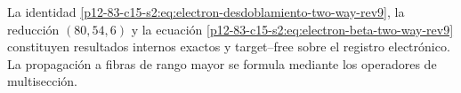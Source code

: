 \begin{statusbox}[title={Clausura interna del refinamiento bidireccional}]
La identidad \eqref{p12-83-c15-s2:eq:electron-desdoblamiento-two-way-rev9}, la reducción
\((80,54,6)\) y la ecuación
\eqref{p12-83-c15-s2:eq:electron-beta-two-way-rev9} constituyen resultados internos exactos
y target--free sobre el registro electrónico. La propagación a fibras de
rango mayor se formula mediante los operadores de multisección.
\end{statusbox}
